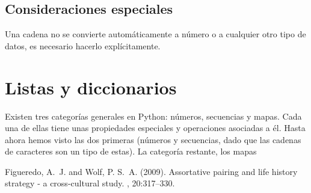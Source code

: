 \documentclass[12pt]{article} %
\begin{document}
\subsection{Consideraciones especiales}
Una cadena no se convierte automáticamente a número o a cualquier otro tipo de datos, es necesario hacerlo explícitamente.

\section{Listas y diccionarios}
Existen tres categorías generales en Python: números, secuencias y mapas. Cada una de ellas tiene unas propiedades especiales y operaciones asociadas a él. Hasta ahora hemos visto las dos primeras (números y secuencias, dado que las cadenas de caracteres son un tipo de estas). La categoría restante, los mapas



\begin{thebibliography}{99} %

Figueredo, A.~J. and Wolf, P. S.~A. (2009).
\newblock Assortative pairing and life history strategy - a cross-cultural
  study.
, 20:317--330.
 
\end{thebibliography}

\end{document}
